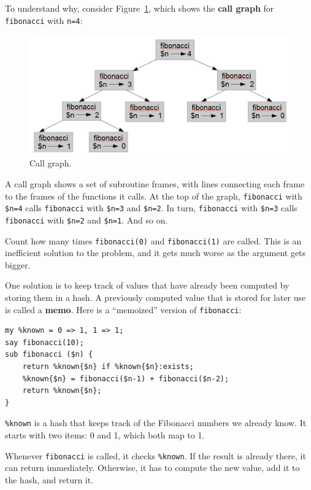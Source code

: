 To understand why, consider Figure~\ref{fig.fibonacci}, which shows
the {\bf call graph} for {\tt fibonacci} with {\tt n=4}:

\begin{figure}
\centerline
{\includegraphics[scale=0.7]{figs/fibonacci.png}}
\caption{Call graph.}
\label{fig.fibonacci}
\end{figure}

A call graph shows a set of subroutine frames, with lines 
connecting each frame to the frames of the functions it 
calls.  At the top of the graph, {\tt fibonacci} with 
\verb'$n=4' calls {\tt fibonacci} with \verb'$n=3' and 
\verb'$n=2'.  In turn, {\tt fibonacci} with \verb'$n=3' calls
{\tt fibonacci} with \verb'$n=2' and \verb'$n=1'.  And so on.

Count how many times {\tt fibonacci(0)} and {\tt fibonacci(1)} 
are called.  This is an inefficient solution to the problem, 
and it gets much worse as the argument gets bigger.

One solution is to keep track of values that have already been
computed by storing them in a hash.  A previously computed value
that is stored for later use is called a {\bf memo}.  Here is a
``memoized'' version of {\tt fibonacci}:

\begin{verbatim}
my %known = 0 => 1, 1 => 1;
say fibonacci(10);
sub fibonacci ($n) {
    return %known{$n} if %known{$n}:exists;
    %known{$n} = fibonacci($n-1) + fibonacci($n-2);
    return %known{$n};
}
\end{verbatim}
%

\verb'%known' is a hash that keeps track of the Fibonacci
numbers we already know.  It starts with
two items: 0 and 1, which both map to 1.

Whenever {\tt fibonacci} is called, it checks \verb'%known'.
If the result is already there, it can return
immediately.  Otherwise, it has to 
compute the new value, add it to the hash, and return it.


